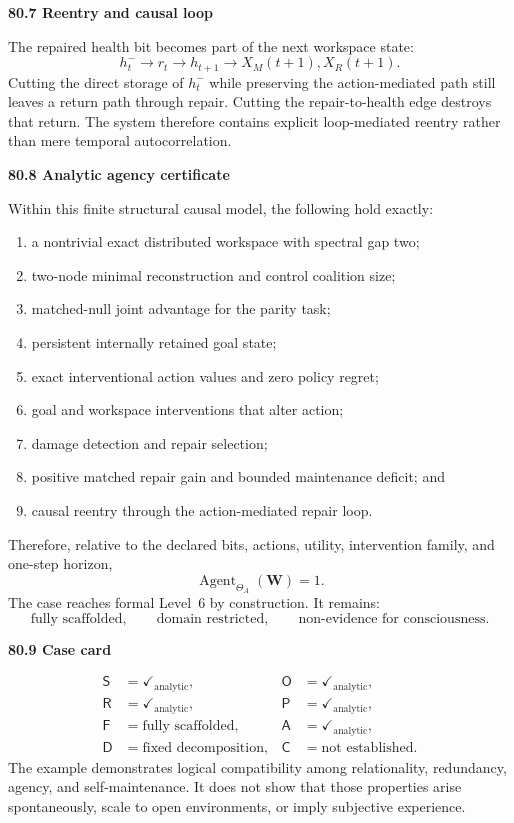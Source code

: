 \documentclass[11pt,letterpaper]{article}
\newcommand{\Workspace}{\mathbf W}
\newcommand{\subtopic}[1]{%
 \vspace{0.45em}
 {\bfseries\color{AccentColor} #1\par}
}
\theoremstyle{plain}
\theoremstyle{definition}
\begin{document}
\subtopic{80.7 Reentry and causal loop}

The repaired health bit becomes part of the next workspace state:
\[
h_t^-
\longrightarrow
r_t
\longrightarrow
h_{t+1}
\longrightarrow
X_M(t+1),X_R(t+1).
\]
Cutting the direct storage of \(h_t^-\) while preserving the action-mediated
path still leaves a return path through repair. Cutting the repair-to-health
edge destroys that return. The system therefore contains explicit
loop-mediated reentry rather than mere temporal autocorrelation.

\subtopic{80.8 Analytic agency certificate}

Within this finite structural causal model, the following hold exactly:
\begin{enumerate}
\item a nontrivial exact distributed workspace with spectral gap two;
\item two-node minimal reconstruction and control coalition size;
\item matched-null joint advantage for the parity task;
\item persistent internally retained goal state;
\item exact interventional action values and zero policy regret;
\item goal and workspace interventions that alter action;
\item damage detection and repair selection;
\item positive matched repair gain and bounded maintenance deficit; and
\item causal reentry through the action-mediated repair loop.
\end{enumerate}
Therefore, relative to the declared bits, actions, utility, intervention family,
and one-step horizon,
\[
\boxed{
\operatorname{Agent}_{\Theta_A}(\Workspace)=1.
}
\]
The case reaches formal Level~6 by construction. It remains:
\[
\text{fully scaffolded},
\qquad
\text{domain restricted},
\qquad
\text{non-evidence for consciousness}.
\]

\subtopic{80.9 Case card}

\[
\boxed{
\begin{aligned}
\mathsf S&=\checkmark_{\mathrm{analytic}},
&\mathsf O&=\checkmark_{\mathrm{analytic}},\\
\mathsf R&=\checkmark_{\mathrm{analytic}},
&\mathsf P&=\checkmark_{\mathrm{analytic}},\\
\mathsf F&=\text{fully scaffolded},
&\mathsf A&=\checkmark_{\mathrm{analytic}},\\
\mathsf D&=\text{fixed decomposition},
&\mathsf C&=\text{not established}.
\end{aligned}
}
\]
The example demonstrates logical compatibility among relationality, redundancy,
agency, and self-maintenance. It does not show that those properties arise
spontaneously, scale to open environments, or imply subjective experience.
\end{document}

